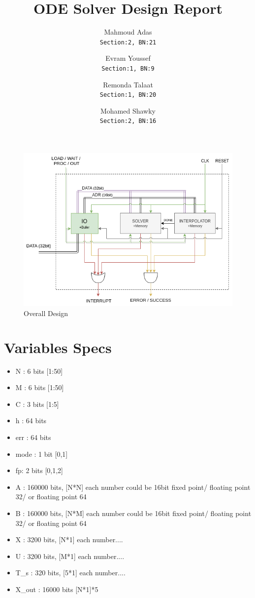 \documentclass[12pt]{extarticle}
\title{ODE Solver Design Report}
\author{
  Mahmoud Adas\\
  \texttt{Section:2, BN:21}
  \and
  Evram Youssef\\
  \texttt{Section:1, BN:9}
  \and
  Remonda Talaat\\
  \texttt{Section:1, BN:20}
  \and
  Mohamed Shawky\\
  \texttt{Section:2, BN:16}
}
\begin{document}
\maketitle

 \begin{figure}[hp]
    \centering
    \includegraphics[width=\textwidth]{d1}
    \caption{Overall Design}
    \label{fig:overall}
\end{figure}

\section{Variables Specs}
\begin{itemize}
    \item N : 6 bits [1:50]
    \item M : 6 bits [1:50]
    \item C : 3 bits [1:5]
    \item h : 64 bits
    \item err : 64 bits
    \item mode : 1 bit [0,1]
    \item fp: 2 bits [0,1,2]
    \item A : 160000 bits, [N*N] each number could be 16bit fixed point/ floating point 32/ or floating point 64
    \item B : 160000 bits, [N*M] each number could be 16bit fixed point/ floating point 32/ or floating point 64
    \item X : 3200 bits, [N*1] each number....
    \item U : 3200 bits, [M*1] each number....
    \item T\_s : 320 bits, [5*1] each number....
    \item X\_out : 16000 bits [N*1]*5
\end{itemize}
\end{document}
